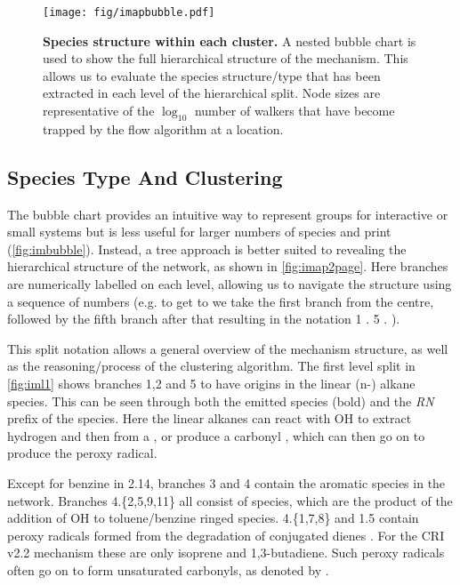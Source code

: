 \begin{figure}[H]
  \centering
  \texttt{[image: fig/imapbubble.pdf]}
  \caption{\textbf{Species structure within each cluster.} A nested bubble chart is used to show the full hierarchical structure of the mechanism. This allows us to evaluate the species structure/type that has been extracted in each level of the hierarchical split. Node sizes are representative of the $\log_{10}$ number of walkers that have become trapped by the flow algorithm at a location. }
    \label{fig:imbubble}
\end{figure}




\subsection{Species Type And Clustering}
The bubble chart provides an intuitive way to represent groups for interactive or small systems but is less useful for larger numbers of species and print (\autoref{fig:imbubble}). Instead, a tree approach is better suited to revealing the hierarchical structure of the network, as shown in \autoref{fig:imap2page}. Here branches are numerically labelled on each level, allowing us to navigate the structure using a sequence of numbers (e.g. to get to  we take the first branch from the centre, followed by the fifth branch after that resulting in the notation 1 . 5 . ).

This split notation allows a general overview of the mechanism structure, as well as the reasoning/process of the clustering algorithm. The first level split in \autoref{fig:iml1} shows branches 1,2 and 5 to have origins in the linear (n-) alkane species. This can be seen through both the emitted species (bold) and the \emph{RN} prefix of the species. Here the linear alkanes can react with OH to extract hydrogen and then from a , or produce a carbonyl \emph{}, which can then go on to produce the \emph{} peroxy radical.

Except for benzine in 2.14, branches 3 and 4 contain the aromatic species in the network.  Branches 4.\{2,5,9,11\} all consist of \emph{} species, which are the product of the addition of OH to toluene/benzine ringed species. 4.\{1,7,8\} and 1.5 contain peroxy radicals formed from the degradation of conjugated dienes \emph{}. For the CRI v2.2 mechanism these are only isoprene and 1,3-butadiene. Such peroxy radicals often go on to form unsaturated carbonyls, as denoted by \emph{}.


